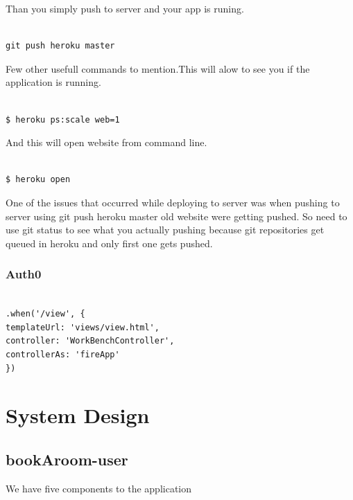 Than you simply push to server and your app is runing.
\bigbreak
\begin{verbatim}

git push heroku master

\end{verbatim}
\bigbreak

Few other usefull commands to mention.This will alow to see you if the application is running.

\bigbreak
\begin{verbatim}

$ heroku ps:scale web=1

\end{verbatim}
\bigbreak

And this will open website from command line.

\bigbreak
\begin{verbatim}

$ heroku open

\end{verbatim}
\bigbreak

One of the issues that occurred while deploying to server was when pushing to server using git push heroku master old website were getting pushed. So need to use git status to see what you actually pushing because git repositories get queued in heroku and only first one gets pushed.

\subsection{Auth0}

\begin{verbatim}

.when('/view', {
templateUrl: 'views/view.html',
controller: 'WorkBenchController',
controllerAs: 'fireApp'
})

\end{verbatim}








\chapter{System Design}
\section{bookAroom-user}
\bigbreak

We have five components to the application

